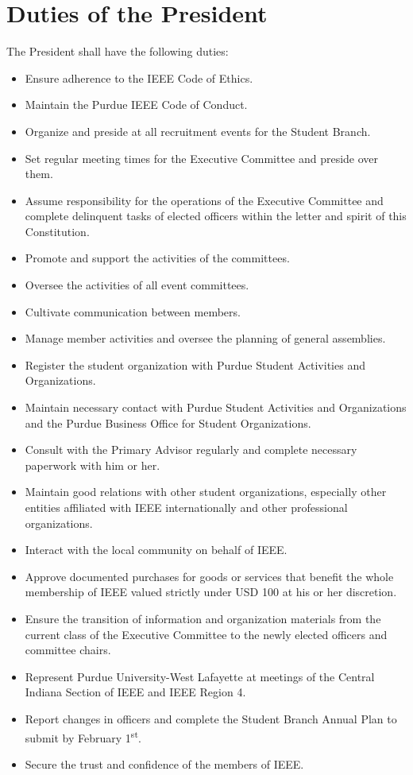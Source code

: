 \documentclass[12pt]{constitution}
\newcommand{\dateannualplansubmit}{February 1\textsuperscript{st}} %
\begin{document}
\section{Duties of the President}
\label{sec:officer_pres}
The President shall have the following duties:
\begin{itemize}
    \item Ensure adherence to the IEEE Code of Ethics.
    \item Maintain the Purdue IEEE Code of Conduct.
    \item Organize and preside at all recruitment events for the Student Branch.
    \item Set regular meeting times for the Executive Committee and preside over them.
    \item Assume responsibility for the operations of the Executive Committee and complete delinquent tasks of elected officers within the letter and spirit of this Constitution.
    \item Promote and support the activities of the committees.
    \item Oversee the activities of all event committees.
    \item Cultivate communication between members.
    \item Manage member activities and oversee the planning of general assemblies.
    \item Register the student organization with Purdue Student Activities and Organizations.
    \item Maintain necessary contact with Purdue Student Activities and Organizations and the Purdue Business Office for Student Organizations.
    \item Consult with the Primary Advisor regularly and complete necessary paperwork with him or her.
    \item Maintain good relations with other student organizations, especially other entities affiliated with IEEE internationally and other professional organizations.
    \item Interact with the local community on behalf of IEEE.
    \item Approve documented purchases for goods or services that benefit the whole membership of IEEE valued strictly under USD 100 at his or her discretion.
    \item Ensure the transition of information and organization materials from the current class of the Executive Committee to the newly elected officers and committee chairs.
    \item Represent Purdue University-West Lafayette at meetings of the Central Indiana Section of IEEE and IEEE Region 4.
    \item Report changes in officers and complete the Student Branch Annual Plan to submit by \dateannualplansubmit{}.
    \item Secure the trust and confidence of the members of IEEE.
\end{itemize}
\end{document}
